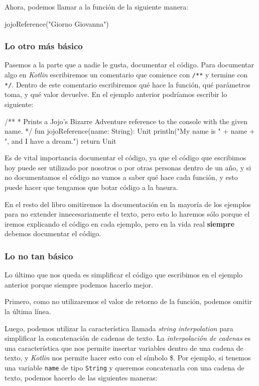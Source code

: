       Ahora, podemos llamar a la función de la siguiente manera:

      \begin{kotlin}
        jojoReference("Giorno Giovanna")
      \end{kotlin}

    \subsubsection{Lo otro más básico}
      Pasemos a la parte que a nadie le gusta, documentar el código.
      Para documentar algo en \textit{Kotlin} escribiremos un comentario que comience con \texttt{/**}
      y termine con \texttt{*/}.
      Dentro de este comentario escribiremos qué hace la función, qué parámetros toma, y qué valor
      devuelve.
      En el ejemplo anterior podríamos escribir lo siguiente:

      \begin{kotlin}
        /**
         * Prints a Jojo's Bizarre Adventure reference to the console with the given name.
         */
        fun jojoReference(name: String): Unit {
          println("My name is " + name + ", and I have a dream.")
          return Unit
        }
      \end{kotlin}
      
      Es de vital importancia documentar el código, ya que el código que escribimos hoy puede ser
      utilizado por nosotros o por otras personas dentro de un año, y si no documentamos el código
      no vamos a saber qué hace cada función, y esto puede hacer que tengamos que botar código a la
      basura.

      En el resto del libro omitiremos la documentación en la mayoría de los ejemplos para no
      extender innecesariamente el texto, pero esto lo haremos sólo porque el iremos explicando el
      código en cada ejemplo, pero en la vida real \textbf{siempre} debemos documentar el código.

    \subsubsection{Lo no tan básico}
      Lo último que nos queda es simplificar el código que escribimos en el ejemplo anterior porque
      siempre podemos hacerlo mejor.
      
      Primero, como no utilizaremos el valor de retorno de la función, podemos omitir la última 
      línea.
      
      Luego, podemos utilizar la característica llamada \textit{string interpolation} para
      simplificar la concatenación de cadenas de texto.
      La \textit{interpolación de cadenas} es una característica que nos permite insertar variables
      dentro de una cadena de texto, y \textit{Kotlin} nos permite hacer esto con el símbolo \$.
      Por ejemplo, si tenemos una variable \texttt{name} de tipo \texttt{String} y queremos
      concatenarla con una cadena de texto, podemos hacerlo de las siguientes maneras:

